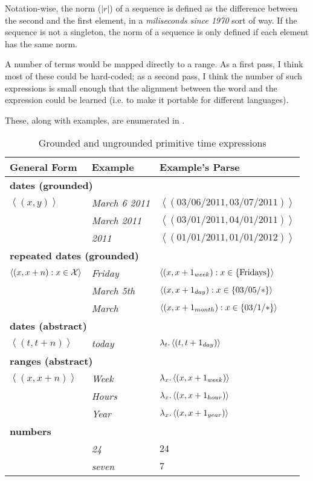 \documentclass{article}
\begin{document}
Notation-wise, the norm ($|r|$) of a sequence is defined as the difference
	between the second and the first element, in a {\em miliseconds since
	1970} sort of way.
If the sequence is not a singleton, the norm of a sequence is only defined
	if each element has the same norm.

A number of terms would be mapped directly to a range.
As a first pass, I think most of these could be hard-coded;
as a second pass, I think the number of such expressions is small enough
	that the alignment between the word and the expression could be learned
	(i.e. to make it portable for different languages).

These, along with examples, are enumerated in .

\begin{table}
\begin{center}
\begin{tabular}{l l l}
	{\bf General Form} & {\bf Example} & {\bf Example's Parse} \\
	\hline
	\hline

	\multicolumn{3}{l}{{\bf dates (grounded)}} \\
		$\left< (x, y) \right>$
		& {\em March 6 2011} & $\left< (03/06/2011, 03/07/2011) \right>$ \\
		& {\em March 2011} & $\left< (03/01/2011, 04/01/2011) \right>$ \\
		& {\em 2011} & $\left< (01/01/2011, 01/01/2012) \right>$ \\
	
	\multicolumn{3}{l}{{\bf repeated dates (grounded)}} \\
		$\left< (x, x+n) : x \in \sX \right>$
		& {\em Friday} & $\left< (x,x+\week{1}) : x \in \{ \T{Fridays} \} \right>$\\
		& {\em March 5th} & $\left< (x,x+\day{1}) : x \in \{ 03/05/* \} \right>$ \\
		& {\em March} & $\left< (x,x+\month{1}) : x \in \{ 03/1/* \} \right>$ \\
	
	\multicolumn{3}{l}{{\bf dates (abstract)}} \\
		$\left< (t, t+n) \right>$
		& {\em today} & $\lambda_t.\left< (t,t+\day{1}) \right>$\\
	
	\multicolumn{3}{l}{{\bf ranges (abstract)}} \\
		$\left< (x, x+n) \right>$
		& {\em Week} & $\lambda_x.\left< (x,x+\week{1}) \right>$\\
		& {\em Hours} & $\lambda_x.\left< (x,x+\hour{1}) \right>$\\
		& {\em Year} & $\lambda_x.\left< (x,x+\year{1}) \right>$\\
	
	\multicolumn{3}{l}{{\bf numbers}} \\
		& {\em 24} & $24$ \\
		& {\em seven} & $7$ \\
	\hline
\end{tabular}
\end{center}
\caption{
\label{tab:primitives}
Grounded and ungrounded primitive time expressions
}
\end{table}
\end{document}
